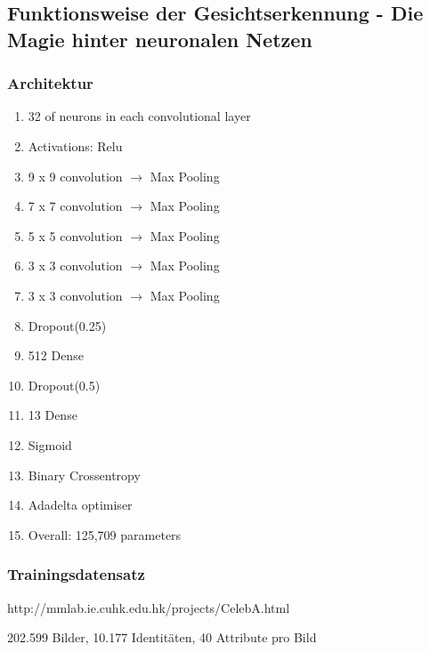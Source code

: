 \documentclass[12.5pt]{scrartcl}
\begin{document}
	\subsection{Funktionsweise der Gesichtserkennung - Die Magie hinter neuronalen Netzen}
	\subsubsection{Architektur}
	\begin{enumerate}
		\item 	32 of neurons in each convolutional layer
		\item Activations: Relu
		\item 9 x 9 convolution $\rightarrow$ Max Pooling
		\item	7 x 7 convolution $\rightarrow$  Max Pooling
		\item	5 x 5 convolution $\rightarrow$  Max Pooling
		\item	3 x 3 convolution $\rightarrow$  Max Pooling
		\item	3 x 3 convolution $\rightarrow$  Max Pooling
		\item	Dropout(0.25)
		\item	512 Dense
		\item	Dropout(0.5)
		\item	13 Dense
		\item	Sigmoid
		\item	Binary Crossentropy
		\item	Adadelta optimiser
		\item Overall: 125,709 parameters
	\end{enumerate}
	\subsubsection{Trainingsdatensatz}
	http://mmlab.ie.cuhk.edu.hk/projects/CelebA.html
	
	202.599 Bilder, 10.177 Identitäten, 40 Attribute pro Bild
	
\end{document}
